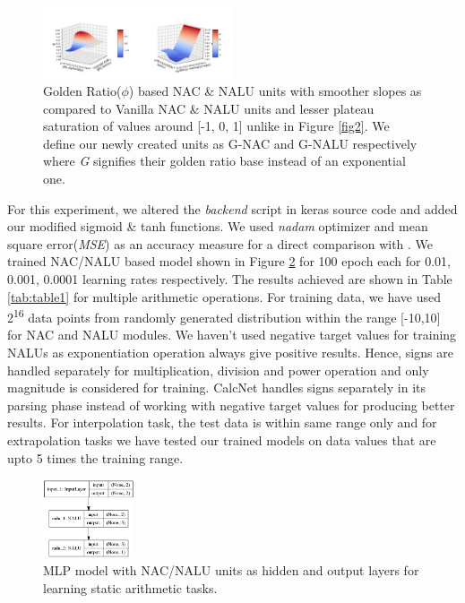 \documentclass[conference]{IEEEtran}
\begin{document}
\begin{figure}[!h]
\centering
\includegraphics[width=0.50\textwidth]{_assets/GoldenNAC&NALU.png}
\caption{Golden Ratio($\phi$) based NAC \& NALU units with smoother slopes as compared to Vanilla NAC \& NALU units and lesser plateau saturation of values around [-1, 0, 1] unlike in Figure \ref{fig2}. We define our newly created units as G-NAC and G-NALU respectively where \textit{G} signifies their golden ratio base instead of an exponential one.}
\label{fig4}
\end{figure}


For this experiment, we altered the \textit{backend} script in keras source code and added our modified sigmoid \& tanh functions. We used \textit{nadam} optimizer and mean square error(\textit{MSE}) as an accuracy measure for a direct comparison with \cite{b5}. We trained NAC/NALU based model shown in Figure \ref{fig5} for 100 epoch each for 0.01, 0.001, 0.0001 learning rates respectively. The results achieved are shown in Table \ref{tab:table1} for multiple arithmetic operations. For training data, we have used 2\textsuperscript{16} data points from randomly generated distribution within the range [-10,10] for NAC and NALU modules. We haven't used negative target values for training NALUs as exponentiation operation always give positive results. Hence, signs are handled separately for multiplication, division and power operation and only magnitude is considered for training. CalcNet handles signs separately in its parsing phase instead of working with negative target values for producing better results. For interpolation task, the test data is within same range only and for extrapolation tasks we have tested our trained models on data values that are upto 5 times the training range. 

\begin{figure}[!h]
\centering
\includegraphics[width=0.24\textwidth]{_assets/model_plot.png}
\caption{MLP model with NAC/NALU units as hidden and output layers for learning static arithmetic tasks.}
\label{fig5}
\end{figure}
\end{document}
